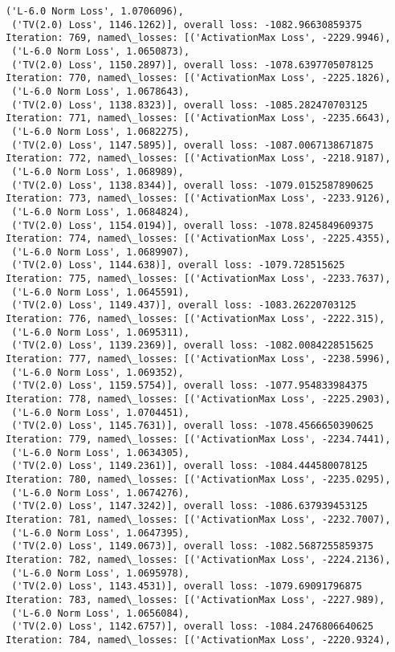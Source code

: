 \documentclass[10pt]{article}
\begin{document}
\begin{Verbatim}[commandchars=\\\{\}]
 ('L-6.0 Norm Loss', 1.0706096),
 ('TV(2.0) Loss', 1146.1262)], overall loss: -1082.96630859375
Iteration: 769, named\_losses: [('ActivationMax Loss', -2229.9946),
 ('L-6.0 Norm Loss', 1.0650873),
 ('TV(2.0) Loss', 1150.2897)], overall loss: -1078.6397705078125
Iteration: 770, named\_losses: [('ActivationMax Loss', -2225.1826),
 ('L-6.0 Norm Loss', 1.0678643),
 ('TV(2.0) Loss', 1138.8323)], overall loss: -1085.282470703125
Iteration: 771, named\_losses: [('ActivationMax Loss', -2235.6643),
 ('L-6.0 Norm Loss', 1.0682275),
 ('TV(2.0) Loss', 1147.5895)], overall loss: -1087.0067138671875
Iteration: 772, named\_losses: [('ActivationMax Loss', -2218.9187),
 ('L-6.0 Norm Loss', 1.068989),
 ('TV(2.0) Loss', 1138.8344)], overall loss: -1079.0152587890625
Iteration: 773, named\_losses: [('ActivationMax Loss', -2233.9126),
 ('L-6.0 Norm Loss', 1.0684824),
 ('TV(2.0) Loss', 1154.0194)], overall loss: -1078.8245849609375
Iteration: 774, named\_losses: [('ActivationMax Loss', -2225.4355),
 ('L-6.0 Norm Loss', 1.0689907),
 ('TV(2.0) Loss', 1144.638)], overall loss: -1079.728515625
Iteration: 775, named\_losses: [('ActivationMax Loss', -2233.7637),
 ('L-6.0 Norm Loss', 1.0645591),
 ('TV(2.0) Loss', 1149.437)], overall loss: -1083.26220703125
Iteration: 776, named\_losses: [('ActivationMax Loss', -2222.315),
 ('L-6.0 Norm Loss', 1.0695311),
 ('TV(2.0) Loss', 1139.2369)], overall loss: -1082.0084228515625
Iteration: 777, named\_losses: [('ActivationMax Loss', -2238.5996),
 ('L-6.0 Norm Loss', 1.069352),
 ('TV(2.0) Loss', 1159.5754)], overall loss: -1077.954833984375
Iteration: 778, named\_losses: [('ActivationMax Loss', -2225.2903),
 ('L-6.0 Norm Loss', 1.0704451),
 ('TV(2.0) Loss', 1145.7631)], overall loss: -1078.4566650390625
Iteration: 779, named\_losses: [('ActivationMax Loss', -2234.7441),
 ('L-6.0 Norm Loss', 1.0634305),
 ('TV(2.0) Loss', 1149.2361)], overall loss: -1084.444580078125
Iteration: 780, named\_losses: [('ActivationMax Loss', -2235.0295),
 ('L-6.0 Norm Loss', 1.0674276),
 ('TV(2.0) Loss', 1147.3242)], overall loss: -1086.637939453125
Iteration: 781, named\_losses: [('ActivationMax Loss', -2232.7007),
 ('L-6.0 Norm Loss', 1.0647395),
 ('TV(2.0) Loss', 1149.0673)], overall loss: -1082.5687255859375
Iteration: 782, named\_losses: [('ActivationMax Loss', -2224.2136),
 ('L-6.0 Norm Loss', 1.0695978),
 ('TV(2.0) Loss', 1143.4531)], overall loss: -1079.69091796875
Iteration: 783, named\_losses: [('ActivationMax Loss', -2227.989),
 ('L-6.0 Norm Loss', 1.0656084),
 ('TV(2.0) Loss', 1142.6757)], overall loss: -1084.2476806640625
Iteration: 784, named\_losses: [('ActivationMax Loss', -2220.9324),

\end{Verbatim}
\end{document}
